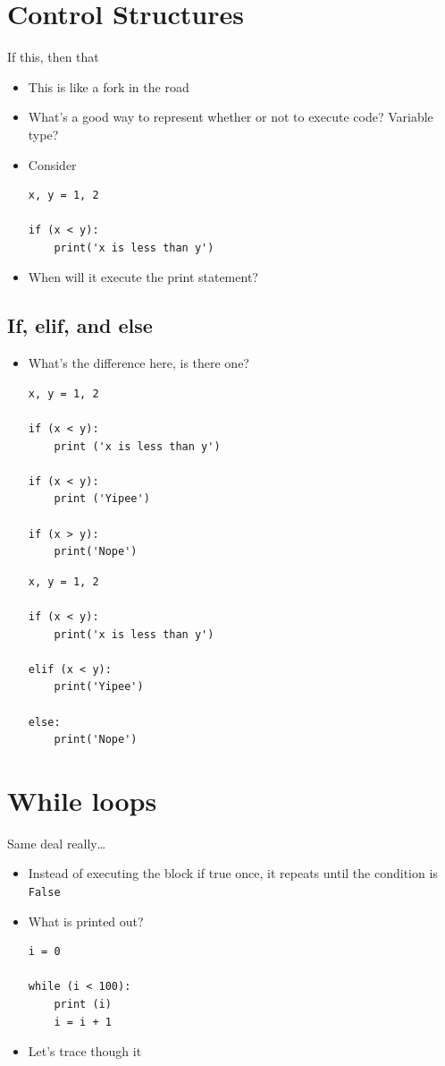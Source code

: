 \documentclass[11pt]{article}
\begin{document}
\section{Control Structures}
\label{sec:org9d6b3f5}
If this, then that

\begin{itemize}
\item This is like a fork in the road
\item What's a good way to represent whether or not to execute code?  Variable type?
\item Consider
\begin{verbatim}
x, y = 1, 2

if (x < y):
    print('x is less than y')
\end{verbatim}
\item When will it execute the print statement?
\end{itemize}
\subsection{If, elif, and else}
\label{sec:org113773a}
\begin{itemize}
\item What's the difference here, is there one?
\begin{verbatim}
x, y = 1, 2

if (x < y):
    print ('x is less than y')

if (x < y):
    print ('Yipee')

if (x > y):
    print('Nope')
\end{verbatim}
\begin{verbatim}
x, y = 1, 2

if (x < y):
    print('x is less than y')

elif (x < y):
    print('Yipee')

else:
    print('Nope')
\end{verbatim}
\end{itemize}
\section{While loops}
\label{sec:orgc37abec}
Same deal really\ldots{}

\begin{itemize}
\item Instead of executing the block if true once, it repeats until the condition is \texttt{False}
\item What is printed out?
\begin{verbatim}
i = 0

while (i < 100):
    print (i)
    i = i + 1
\end{verbatim}

\item Let's trace though it
\end{itemize}
\end{document}
